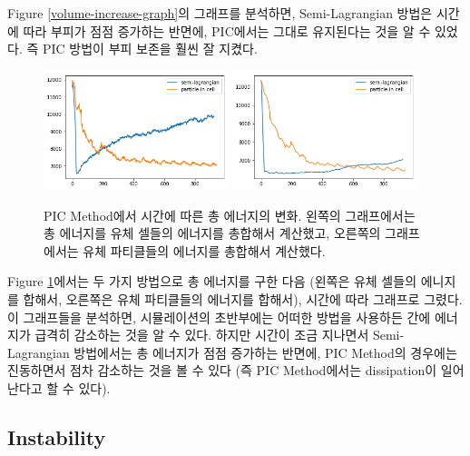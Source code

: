 \documentclass[12pt, A4]{article}
\begin{document}
Figure \ref{volume-increase-graph}의 그래프를 분석하면, Semi-Lagrangian 방법은 시간에 따라 부피가 점점 증가하는 반면에, PIC에서는 그대로 유지된다는 것을 알 수 있었다. 즉 PIC 방법이 부피 보존을 훨씬 잘 지켰다.

\begin{figure}[h]
  \centering
  \includegraphics[width=0.48\textwidth]{picflip-energy-graph}
  \includegraphics[width=0.48\textwidth]{picflip-particle-energy-graph}
  \caption{PIC Method에서 시간에 따른 총 에너지의 변화. 왼쪽의 그래프에서는 총 에너지를 유체 셀들의 에너지를 총합해서 계산했고, 오른쪽의 그래프에서는 유체 파티클들의 에너지를 총합해서 계산했다.}
  \label{energy-graph}
\end{figure}

Figure \ref{energy-graph}에서는 두 가지 방법으로 총 에너지를 구한 다음 (왼쪽은 유체 셀들의 에니지를 합해서, 오른쪽은 유체 파티클들의 에너지를 합해서), 시간에 따라 그래프로 그렸다. 이 그래프들을 분석하면, 시뮬레이션의 초반부에는 어떠한 방법을 사용하든 간에 에너지가 급격히 감소하는 것을 알 수 있다. 하지만 시간이 조금 지나면서 Semi-Lagrangian 방법에서는 총 에너지가 점점 증가하는 반면에, PIC Method의 경우에는 진동하면서 점차 감소하는 것을 볼 수 있다 (즉 PIC Method에서는 dissipation이 일어난다고 할 수 있다).

\subsection{Instability}
\end{document}
